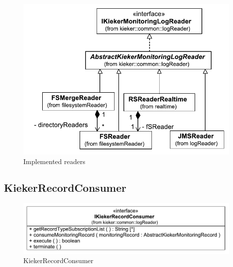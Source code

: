 \documentclass[12pt,journal,a4paper,twocolumn,final,oneside]{IEEEtran}%
\begin{document}
\begin{figure}[h]\centering
\includegraphics[scale=0.55]{figures/model/kieker_readerimpls}%
\caption{Implemented readers}
\end{figure}

\subsection{KiekerRecordConsumer}

\begin{figure}[h]\centering
\includegraphics[scale=0.55]{figures/model/kieker_KiekerRecordConsumer}%
\caption{KiekerRecordConsumer}
\end{figure}

\nocite{vanHoornRohrHasselbringWallerEhlersFreyKieselhorst2009TRContinuousMonitoringOfSoftwareServicesDesignAndApplicationOfTheKiekerFramework,RohrHoornMatevskaStoeverSommerGieseckeHasselbring2008KiekerContinuousMonitoringAndOnDemandVisualizationOfJavaSoftwareBehavior}

\end{document}
